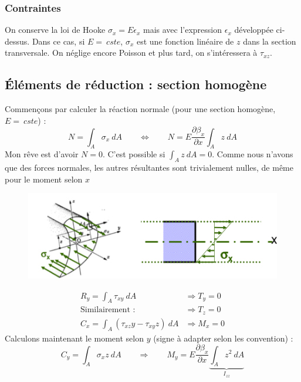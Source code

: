 		\subsubsection{Contraintes}
		On conserve la loi de Hooke $\sigma_x = E\epsilon_x$ mais avec 
		l'expression $\epsilon_x$ développée ci-dessus. Dans ce cas, si 
		$E =\ cste$, $\sigma_x$ est une fonction linéaire de $z$ dans la 
		section transversale. On néglige encore Poisson et plus tard, on 
		s'intéressera à $\tau_{xz}$.
		
	\subsection{Éléments de réduction : section homogène}
	Commençons par calculer la réaction normale (pour une section homogène, 
	$E =\ cste$) :
	\begin{equation}
	N = \int_A\sigma_x\ dA\qquad\Leftrightarrow\qquad N = E\dfrac{\partial 
	\beta_x}{\partial x}\int_A z\ dA
	\end{equation}
	Mon rêve est d'avoir $N=0$. C'est possible si $\int_A z\ dA=0$. Comme 
	nous n'avons que des forces normales, les autres résultantes sont 
	trivialement nulles, de même pour le moment selon $x$
			\begin{figure}
	\vspace{-5mm}
	\includegraphics[scale=0.45]{ch4/image2.png}
	\end{figure}
	\begin{equation}
	\begin{array}{ll}
	R_y = \int_A \tau_{xy}\ dA &\Longrightarrow T_y = 0\\
	\text{Similairement : }&\Longrightarrow T_z = 0\\
	C_x = \int_A(\tau_{xz}y-\tau_{xy}z)\ dA &\Longrightarrow M_x=0
	\end{array}
	\end{equation}
	Calculons maintenant le moment selon $y$ (signe à adapter selon les 
	convention) : 
	\begin{equation}
	C_y = \int_A \sigma_xz\ dA\qquad\Longrightarrow\qquad M_y = E\dfrac{
	\partial \beta_x}{\partial x}\underbrace{\int_Az^2\ dA}_{I_{zz}}
	\end{equation}
